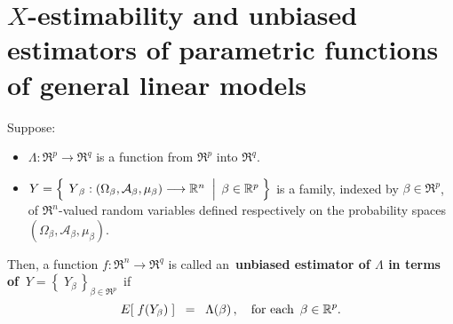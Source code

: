 

\section{$X$-estimability and unbiased estimators of parametric functions of general linear models}
\setcounter{theorem}{0}
\setcounter{equation}{0}

\renewcommand{\theenumi}{\roman{enumi}}
\renewcommand{\labelenumi}{\textnormal{(\theenumi)}$\;\;$}


\begin{definition}
\mbox{}\vskip 0.1cm\noindent
Suppose:
\begin{itemize}
\item
	$\Lambda : \Re^{p} \longrightarrow \Re^{q}$ is a function from $\Re^{p}$ into $\Re^{q}$.
\item
	$Y = \left\{\;
		\left.
		\overset{{\color{white}.}}{Y}_{\beta} : (\Omega_{\beta},\mathcal{A}_{\beta},\mu_{\beta}) \longrightarrow \Re^{n}
		\;\;\right\vert\;
		\beta \in \Re^{p}
		\;\right\}$
	is a family, indexed by $\beta \in \Re^{p}$,
	of $\Re^{n}$-valued random variables defined respectively on the
	probability spaces $(\Omega_{\beta},\mathcal{A}_{\beta},\mu_{\beta})$.
\end{itemize}
Then,
a function $f : \Re^{n} \longrightarrow \Re^{q}$ is called an
\,{\color{red}\textbf{unbiased estimator of $\Lambda$ in terms of \,$Y = \left\{\;Y_{\beta}\,\right\}_{\beta\in\Re^{p}}$}}\,
if
\begin{equation*}
E\!\left[\;f(Y_{\beta})\;\right] \;\; =\;\; \Lambda(\beta)\,,
\quad
\textnormal{for each \,$\beta \in \Re^{p}$}.
\end{equation*}
\end{definition}

